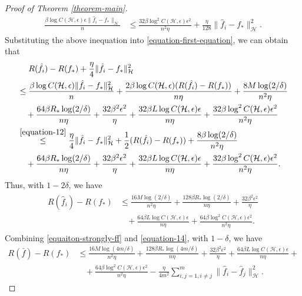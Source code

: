 \documentclass{article}
\begin{document}
\begin{proof}[Proof of Theorem \ref{theorem-main}]
\begin{align*}
    \frac{\beta \log C(\mathcal{H},\epsilon)\epsilon \|\hat{f}_i-f_\ast\|_\mathcal{H}}{n}
    &\leq \frac{32\beta \log^2 C(\mathcal{H},\epsilon)\epsilon^2}{n^2\eta}+\frac{\eta }{128}\|\hat{f}_i-f_\ast\|_\mathcal{H}^2.
  \end{align*}
 Substituting the above  inequation into \eqref{equation-first-equation}, we can obtain that
 \begin{align*}
   &~~~~R(\hat{f}_i)-R(f_\ast)+\frac{\eta}{4}\|\hat{f}_i-f_\ast\|_\mathcal{H}^2\\
   &\leq \frac{\beta \log C(\mathcal{H},\epsilon)\|\hat{f}_i-f_\ast\|_\mathcal{H}^2}{n}+
   \frac{2\beta \log C(\mathcal{H},\epsilon)(R(\hat{f}_i)-R(f_\ast))}{n\eta}+\frac{8M \log(2/\delta)}{n^2\eta}\\
   &~~~+\frac{64\beta R_\ast\log(2/\delta)}{n\eta}+\frac{32\beta^2\epsilon^2}{\eta}+
   \frac{32\beta L \log C(\mathcal{H},\epsilon)\epsilon}{n\eta}+
   \frac{32\beta \log^2 C(\mathcal{H},\epsilon)\epsilon^2}{n^2\eta}\\
   &\overset{\eqref{equation-12}}{\leq}
   \frac{\eta}{4}\|\hat{f}_i-f_\ast\|_\mathcal{H}^2+\frac{1}{2}(R(\hat{f}_i)-R(f_\ast))+\frac{8\beta \log(2/\delta)}{n^2\eta}\\
   &~~~+\frac{64\beta R_\ast\log(2/\delta)}{n\eta}+\frac{32\beta^2\epsilon^2}{\eta}+
   \frac{32\beta L \log C(\mathcal{H},\epsilon)\epsilon}{n\eta}+
   \frac{32\beta \log^2 C(\mathcal{H},\epsilon)\epsilon^2}{n^2\eta}.
 \end{align*}
 Thus, with $1-2\delta$, we have
 \begin{align}
    \label{equation-14}
    \begin{aligned}
    R(\hat{f}_i)-R(f_\ast)&\leq
    \frac{16M \log(2/\delta)}{n^2\eta}+\frac{128\beta R_\ast\log(2/\delta)}{n\eta}+\frac{32\beta^2\epsilon^2}{\eta}\\
    &~~~~+
   \frac{64\beta L \log C(\mathcal{H},\epsilon)\epsilon}{n\eta}+
   \frac{64\beta \log^2 C(\mathcal{H},\epsilon)\epsilon^2}{n^2\eta}.
   \end{aligned}
  \end{align}
  Combining \eqref{equaiton-strongly-ff} and \eqref{equation-14},
  with $1-\delta$,
  we have
  \begin{align*}
    R(\bar{f})-R(f_\ast)&\leq
    \frac{16M \log(4m/\delta)}{n^2\eta}+\frac{128\beta R_\ast\log(4m/\delta)}{n\eta}+\frac{32\beta^2\epsilon^2}{\eta}+
   \frac{64\beta L \log C(\mathcal{H},\epsilon)\epsilon}{n\eta}+\\
   &~~~~+
   \frac{64\beta \log^2 C(\mathcal{H},\epsilon)\epsilon^2}{n^2\eta}
  -\frac{\eta}{4m^2}\sum_{i,j=1,i\not=j}^m\|\hat{f}_i-\hat{f}_j\|_\mathcal{H}^2.
  \end{align*}
\end{proof}
\end{document}
